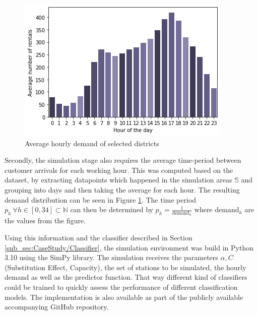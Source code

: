 \begin{figure}[htbp]
  \centering
  \includegraphics[width=.5\linewidth]{./Figures/hourly-demand.png}
  \caption{Average hourly demand of selected districts}
  \label{fig:Demand}
\end{figure}

Secondly, the simulation stage also requires the average time-period between customer arrivals for each working hour.
This was computed based on the dataset, by extracting datapoints which happened in the simulation areas $\mathbb{S}$ 
and grouping into days and then taking the average for each hour. The resulting
demand distribution can be seen in Figure \ref{fig:Demand}. The time period $p_h \ \forall h \in [0, 34] \subset \mathbb{N}$
can then be determined by $p_h = \frac{1}{\text{demand}_h}$ where $\text{demand}_h$ are the values from the figure.

Using this information and the classifier described in Section \ref{sub_sec:CaseStudy/Classifier}, the simulation environment
was build in Python 3.10 using the SimPy library. The simulation receives the parameters $\alpha, C$ (Substitution Effect, Capacity),
the set of stations to be simulated, the hourly demand as well as the predictor function. That way different kind of classifiers
could be trained to quickly assess the performance of different classification models. The implementation
is also available as part of the publicly available accompanying GitHub repository.
